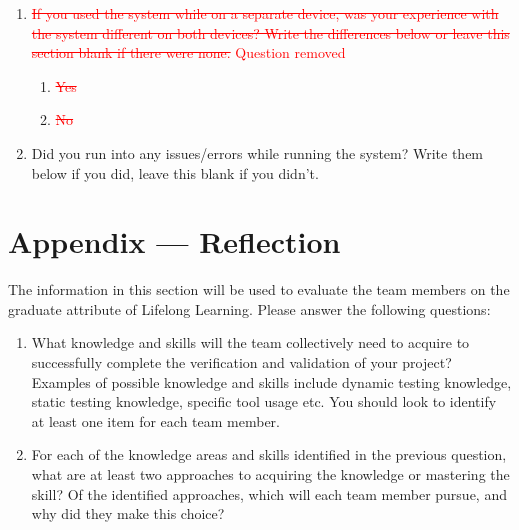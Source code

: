 \documentclass[12pt, titlepage]{article}
\begin{document}
\begin{enumerate}
\item \textcolor{red}{\sout{If you used the system while on a separate device, was your experience with the system different on both devices? Write the differences below or leave this section blank if there were none.} Question removed}
   \begin{enumerate}
     \item \textcolor{red}{\sout{Yes}}
     \item \textcolor{red}{\sout{No}}
   \end{enumerate}

\item Did you run into any issues/errors while running the system? Write them below if you did, leave this blank if you didn't.




   
\end{enumerate}




\newpage{}
\section*{Appendix --- Reflection}

The information in this section will be used to evaluate the team members on the
graduate attribute of Lifelong Learning.  Please answer the following questions:

\begin{enumerate}
  \item What knowledge and skills will the team collectively need to acquire to
  successfully complete the verification and validation of your project?
  Examples of possible knowledge and skills include dynamic testing knowledge,
  static testing knowledge, specific tool usage etc.  You should look to
  identify at least one item for each team member.
  \item For each of the knowledge areas and skills identified in the previous
  question, what are at least two approaches to acquiring the knowledge or
  mastering the skill?  Of the identified approaches, which will each team
  member pursue, and why did they make this choice?
\end{enumerate}
\end{document}
